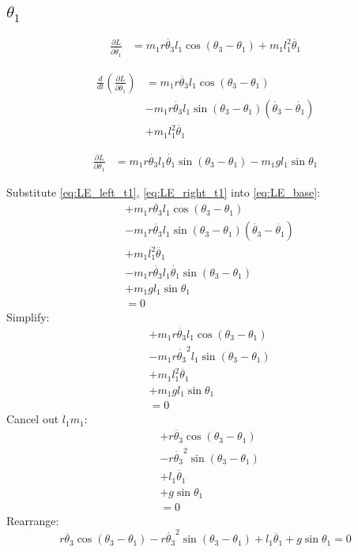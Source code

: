 \documentclass[titlepage]{article}
\numberwithin{equation}{section}
\begin{document}
\pagebreak
\subsection{$\theta_1$}
\begin{align}
\frac{\partial L}{\partial \dot{\theta_1}} &= m_1 r \dot{\theta_3} l_1 \cos{(\theta_3 - \theta_1)} + m_1 l_1^2 \dot{\theta_1}
\end{align}

\begin{align}
\frac{d}{dt} \left(\frac{\partial L}{\partial \dot{\theta_1}}\right) &= m_1 r \ddot{\theta_3} l_1 \cos{(\theta_3 - \theta_1)} \nonumber \\
 &- m_1 r \dot{\theta_3} l_1 \sin{(\theta_3 - \theta_1)} (\dot{\theta_3} - \dot{\theta_1}) \nonumber \\
 &+ m_1 l_1^2 \ddot{\theta_1} \label{eq:LE_left_t1}
\end{align}

\begin{align}
\frac{\partial L}{\partial \theta_1} &= m_1 r \dot{\theta_3} l_1 \dot{\theta_1} \sin{(\theta_3 - \theta_1)} - m_1 g l_1 \sin \theta_1 \label{eq:LE_right_t1}
\end{align}

\bigskip
\noindent
Substitute \ref{eq:LE_left_t1}, \ref{eq:LE_right_t1} into \ref{eq:LE_base}:
\begin{align}
 &+ m_1 r \ddot{\theta_3} l_1 \cos{(\theta_3 - \theta_1)} \nonumber \\
 &- m_1 r \dot{\theta_3} l_1 \sin{(\theta_3 - \theta_1)} (\dot{\theta_3} - \dot{\theta_1}) \nonumber \\
 &+ m_1 l_1^2 \ddot{\theta_1} \nonumber \\
 &- m_1 r \dot{\theta_3} l_1 \dot{\theta_1} \sin{(\theta_3 - \theta_1)} \nonumber \\
 &+ m_1 g l_1 \sin \theta_1 \nonumber \\
 &= 0
\end{align}
Simplify:
\begin{align}
 &+ m_1 r \ddot{\theta_3} l_1 \cos{(\theta_3 - \theta_1)} \nonumber \\
 &- m_1 r \dot{\theta_3}^2 l_1 \sin{(\theta_3 - \theta_1)} \nonumber \\
 &+ m_1 l_1^2 \ddot{\theta_1} \nonumber \\
 &+ m_1 g l_1 \sin \theta_1 \nonumber \\
 &= 0
\end{align}
Cancel out $l_1 m_1$:
\begin{align}
 &+ r \ddot{\theta_3} \cos{(\theta_3 - \theta_1)} \nonumber \\
 &- r \dot{\theta_3}^2 \sin{(\theta_3 - \theta_1)} \nonumber \\
 &+ l_1 \ddot{\theta_1} \nonumber \\
 &+ g \sin \theta_1 \nonumber \\
 &= 0
\end{align}
Rearrange:
\begin{equation}
 r \ddot{\theta_3} \cos{(\theta_3 - \theta_1)} - r \dot{\theta_3}^2 \sin{(\theta_3 - \theta_1)} + l_1 \ddot{\theta_1} + g \sin \theta_1 = 0
\end{equation}
\end{document}
